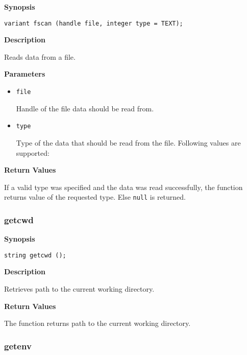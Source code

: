 \documentclass[a4paper, 10pt, titlepage]{article}
\begin{document}
\textbf{Synopsis}

\begin{verbatim}
variant fscan (handle file, integer type = TEXT);
\end{verbatim}

\textbf{Description}

Reads data from a file.

\textbf{Parameters}

\begin{itemize}
\item \texttt{file}

Handle of the file data should be read from.

\item \texttt{type}

Type of the data that should be read from the file. Following values are supported:
\end{itemize}

\textbf{Return Values}

If a valid type was specified and the data was read successfully, the function returns value of the requested type. Else \texttt{null} is returned.

\subsubsection{getcwd}

\textbf{Synopsis}

\begin{verbatim}
string getcwd ();
\end{verbatim}

\textbf{Description}

Retrieves path to the current working directory.

\textbf{Return Values}

The function returns path to the current working directory.

\subsubsection{getenv}
\end{document}
